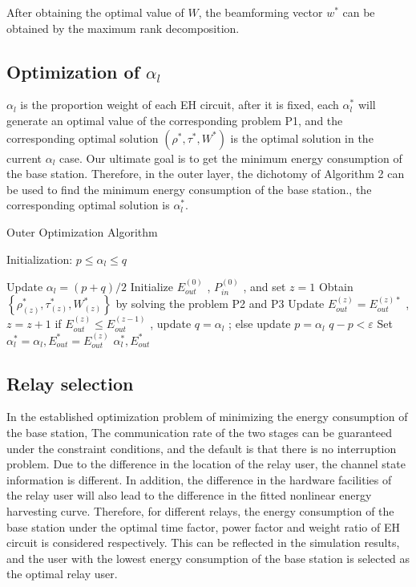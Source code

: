 \documentclass[conference]{IEEEtran}
\begin{document}
After obtaining the optimal value of $W$, the beamforming vector $w ^{\ast }$ can be obtained by the maximum rank decomposition.

\subsection{Optimization of $\alpha _{l}$ }\label{BB}

$\alpha _{l}$  is the proportion weight of each EH circuit, after it is fixed, each $\alpha _{l}  ^{\ast }$ will generate an optimal value of the corresponding problem P1, and the corresponding optimal solution $( {\rho^{\ast }} , {\tau^{\ast }} , {W^{\ast }} )$ is the optimal solution in the current $\alpha _{l}$ case. Our ultimate goal is to get the minimum energy consumption of the base station. Therefore, in the outer layer, the dichotomy of Algorithm 2 can be used to find the minimum energy consumption of the base station., the corresponding optimal solution is $\alpha _{l}  ^{\ast }$.

\begin{algorithm}
	\renewcommand{\algorithmicrequire}{\textbf{Input:}}
	\renewcommand{\algorithmicensure}{\textbf{Output:}}
	\caption{Outer Optimization Algorithm}
	\label{alg1}
	\begin{algorithmic}[1]
		\STATE Initialization: $p\le \alpha _{l} \le q$
		
		\REPEAT
           \STATE Update $\alpha _{l}= (p+q)/2$
		\STATE Initialize $E_{out}^{(0)} $ , $P_{in}^{(0)}$ , and set $z=1$
		\STATE Obtain $\left \{ \rho _{(z)}^{\ast } ,\tau _{(z)}^{\ast },W _{(z)}^{\ast } \right \} $ by solving the problem P2 and P3
		\STATE Update $ E_{out}^{(z)}=E_{out}^{(z)\ast}$ , $z=z+1$
		\STATE if $E_{out}^{(z)}\le  E_{out}^{(z-1)}$ , update $q= \alpha _{l}$ ; else update $p= \alpha _{l}$
		\UNTIL $q-p< \varepsilon$
		\STATE   Set $\alpha _{l}^{\ast } = \alpha _{l} ,  E_{out}^{\ast} = E_{out}^{(z)}  $
		\ENSURE  $\alpha _{l}^{\ast }  , E_{out}^{\ast}$
	\end{algorithmic}  
\end{algorithm}

\subsection{Relay selection}\label{BB}

In the established optimization problem of minimizing the energy consumption of the base station, The communication rate of the two stages can be guaranteed under the constraint conditions, and the default is that there is no interruption problem. 
Due to the difference in the location of the relay user, the channel state information is different. In addition, the difference in the hardware facilities of the relay user will also lead to the difference in the fitted nonlinear energy harvesting curve. Therefore, for different relays, the energy consumption of the base station under the optimal time factor, power factor and weight ratio of EH circuit is considered respectively. This can be reflected in the simulation results, and the user with the lowest energy consumption of the base station is selected as the optimal relay user.
\end{document}
